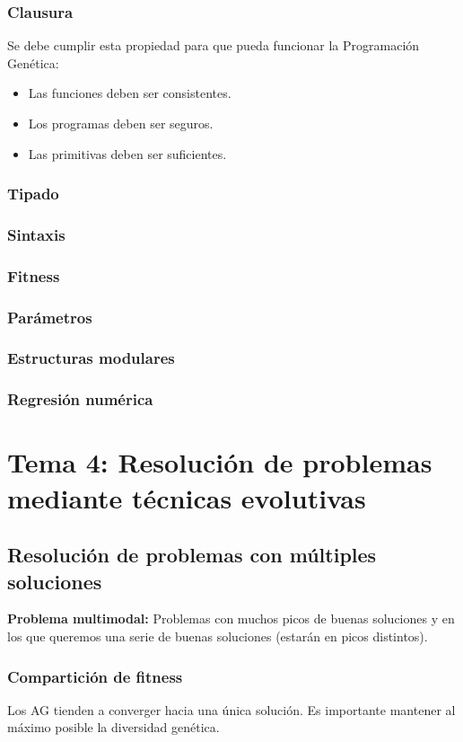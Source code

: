 \documentclass[12pt, twoside, openright]{report} %
\begin{document}
\subsection{Clausura}
Se debe cumplir esta propiedad para que pueda funcionar la Programación Genética:
\begin{itemize}
	\item Las funciones deben ser consistentes.
	\item Los programas deben ser seguros.
	\item Las primitivas deben ser suficientes.
\end{itemize}

\subsection{Tipado}
\subsection{Sintaxis}
\subsection{Fitness}
\subsection{Parámetros}
\subsection{Estructuras modulares}
\subsection{Regresión numérica}

\chapter{Tema 4: Resolución de problemas mediante técnicas evolutivas}
\section{Resolución de problemas con múltiples soluciones}
\textbf{Problema multimodal:} Problemas con muchos picos de buenas soluciones y en los que queremos una serie de buenas soluciones (estarán en picos distintos).

\subsection{Compartición de fitness}
Los AG tienden a converger hacia una única solución. Es importante mantener al máximo posible la diversidad genética.
\end{document}

